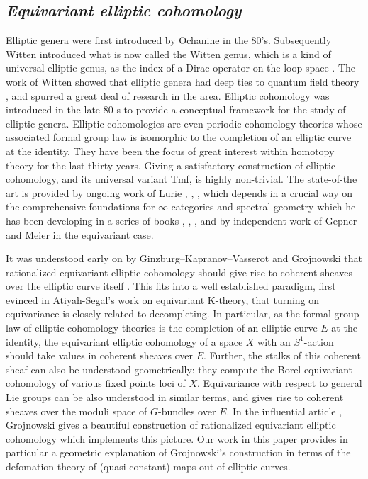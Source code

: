 \documentclass[11pt,letterpaper]{amsart}
\begin{document}
\subsection*{\emph{Equivariant elliptic cohomology}}
Elliptic genera were first introduced by Ochanine in the 80's. Subsequently Witten   introduced what is now called the Witten genus, which is a kind of universal elliptic genus,   as the index of a Dirac operator on the loop space \cite{WitDir}. The work of Witten showed that elliptic genera had deep ties to quantum field theory \cite{WitQuant}, and spurred a great deal of research in the area. Elliptic cohomology was introduced in the late $80$-s to provide a conceptual framework for the study of elliptic genera. Elliptic cohomologies are even periodic cohomology theories whose associated formal group law is isomorphic to the completion of an elliptic curve at the identity. They have been the focus of great interest within  homotopy theory  for the last thirty years. Giving a satisfactory construction of elliptic cohomology, and its universal variant Tmf, is highly non-trivial. The state-of-the art is provided by ongoing work of Lurie \cite{ELL1}, \cite{ELL2}, \cite{ELL3}, which depends in a crucial way on the comprehensive foundations for  $\infty$-categories and spectral geometry which he has been developing in a series of books \cite{HTT}, \cite{HA}, \cite{SAG}, and by independent work of Gepner and Meier \cite{GM1} in the equivariant case.


It was understood early on by Ginzburg--Kapranov--Vasserot and Grojnowski that rationalized equivariant elliptic cohomology should give rise to coherent sheaves over the elliptic curve itself \cite{GKV} \cite{groj}. This fits into a well established  paradigm, first evinced in Atiyah-Segal's work on equivariant K-theory, that turning on equivariance is closely related to decompleting. In particular, as the formal group law of elliptic cohomology theories is the completion of an elliptic curve $E$ at the identity, the equivariant elliptic cohomology of a space $X$ with an $S^1$-action should take values in coherent sheaves over $E$. Further, the  stalks of this coherent sheaf can also be understood geometrically: they compute the Borel equivariant cohomology of various fixed points loci of $X$. Equivariance with respect to general Lie groups can be also understood in similar terms, and gives rise to coherent sheaves over the moduli space of $G$-bundles over $E$. In the influential article \cite{groj}, Grojnowski gives a beautiful construction of rationalized equivariant elliptic cohomology which implements this picture. Our work in this paper provides in particular  a  geometric explanation of Grojnowski's construction in terms of the defomation theory of (quasi-constant) maps out of  elliptic curves. 
\end{document}

